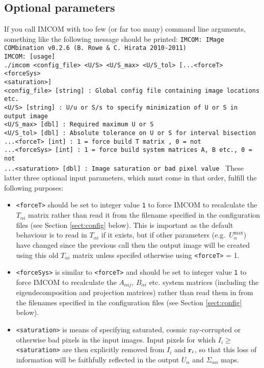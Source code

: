 \documentclass[10pt]{article}
\begin{document}
\subsection{Optional parameters}
If you call IMCOM with too few (or far too many) command line arguments, something like the following message should be printed:
\newline \newline
\texttt{IMCOM: IMage COMbination v0.2.6 (B. Rowe \& C. Hirata 2010-2011) \\
IMCOM: [usage] \\
 ./imcom <config\_file> <U/S> <U/S\_max> <U/S\_tol> [...<forceT> <forceSys> \\ <saturation>] \\
 \newline
  <config\_file> [string] : Global config file containing image locations etc. \\
  <U/S> [string] : U/u or S/s to specify minimization of U or S in output image \\
  <U/S\_max> [dbl]         : Required maximum U or S \\
  <U/S\_tol> [dbl]         : Absolute tolerance on U or S for interval bisection \\
 ...<forceT> [int]           : 1 = force build T matrix , 0 = not                 \\
   ...<forceSys> [int]      : 1 = force build system matrices A, B etc., 0 = not  \\
   ...<saturation> [dbl] : Image saturation or bad pixel value                 }
\newline \newline
These latter three optional input parameters, which must come in that order, fulfill the following purposes:
\begin{itemize}
\item \texttt{<forceT>} should be set to integer value \texttt{1} to force IMCOM to recalculate the $T_{\alpha i}$ matrix rather than read it from the filename specified in the configuration files (see Section \ref{sect:config} below).  This is important as the default behaviour is to read in $T_{\alpha i }$ if it exists, but if other parameters (e.g.\ $U_{\alpha}^{\textrm{max}}$) have changed since the previous call then the output image will be created using this old $T_{\alpha i}$ matrix unless specifed otherwise using \texttt{<forceT>} = 1.
\item \texttt{<forceSys>} is similar to \texttt{<forceT>} and should be set to integer value \texttt{1} to force IMCOM to recalculate the $A_{\alpha ij}$, $B_{\alpha i}$ etc. system matrices (including the eigendecomposition and projection matrices) rather than read them in from the filenames specified in the configuration files (see Section \ref{sect:config} below). 
\item \texttt{<saturation>} is means of specifying saturated, cosmic ray-corrupted or otherwise bad pixels in the input images.  Input pixels for which $I_i \ge $ \texttt{<saturation>} are then explicitly removed from $I_i$ and ${\bf r}_i$, so that this loss of information will be faithfully reflected in the output $U_{\alpha}$ and $\Sigma_{\alpha \alpha}$ maps.
\end{itemize}
\end{document}
